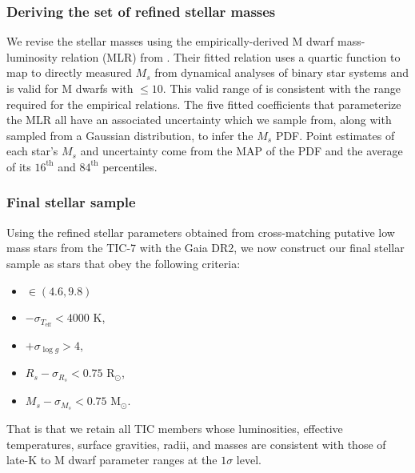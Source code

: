 \subsubsection{Deriving the set of refined stellar masses}
We revise the stellar masses using the empirically-derived M dwarf mass-luminosity relation (MLR) from  
\cite{benedict16}. Their fitted relation uses a quartic function to map \MK{} to directly measured $M_s$ from
dynamical analyses of binary star systems and is valid for M dwarfs with \MK{} $\leq 10$. This valid range of 
\MK{} is consistent with the range required for the \cite{mann15} empirical relations. The five fitted
coefficients that parameterize the MLR all have an associated uncertainty which we sample from, along with \MK{}
sampled from a Gaussian distribution, to infer the $M_s$ PDF. Point estimates of each star's $M_s$ and uncertainty
come from the MAP of the PDF and the average of its $16^{\text{th}}$ and $84^{\text{th}}$ percentiles. 

\subsubsection{Final stellar sample}
Using the refined stellar parameters obtained from cross-matching putative low mass stars from the TIC-7 with
the Gaia DR2, we now construct our final stellar sample as stars that obey the following criteria:

\begin{itemize}
\item \MK{} $\in (4.6,9.8)$
\item \teff{} $- \sigma_{T_{\text{eff}}} < 4000$ K,
\item \logg{} $+ \sigma_{\log{g}}>4$,
\item $R_s -\sigma_{R_s} < 0.75$ R$_{\odot}$,
\item $M_s - \sigma_{M_s} < 0.75$ M$_{\odot}$.
\end{itemize}

\noindent That is that we retain all TIC members whose luminosities, effective temperatures, surface
gravities, radii, and masses are consistent with those of late-K to M dwarf parameter ranges
\citep{pecaut13} at the $1\sigma$ level. \\

